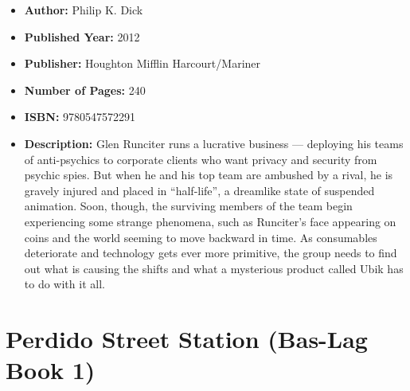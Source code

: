 \documentclass{tufte-handout}
\begin{document}
\begin{itemize}
    \item[] \textbf{Author:} Philip K. Dick
    \item[] \textbf{Published Year:} 2012
    \item[] \textbf{Publisher:} Houghton Mifflin Harcourt/Mariner
    \item[] \textbf{Number of Pages:} 240      
    \item[] \textbf{ISBN:} 9780547572291
    \item[] \textbf{Description:} Glen Runciter runs a lucrative business --- deploying his teams of anti-psychics to corporate clients who want privacy and security from psychic spies. But when he and his top team are ambushed by a rival, he is gravely injured and placed in ``half-life'', a dreamlike state of suspended animation. Soon, though, the surviving members of the team begin experiencing some strange phenomena, such as Runciter’s face appearing on coins and the world seeming to move backward in time. As consumables deteriorate and technology gets ever more primitive, the group needs to find out what is causing the shifts and what a mysterious product called Ubik has to do with it all. 
\end{itemize}

\section*{Perdido Street Station (Bas-Lag Book 1)}
\end{document}
